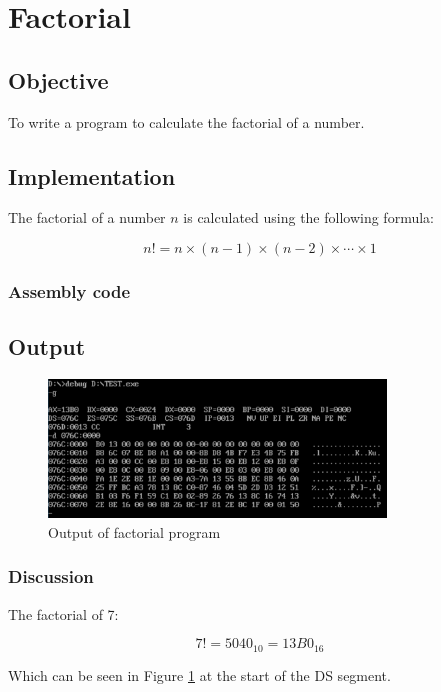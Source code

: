 \section{Factorial}

\subsection{Objective}

To write a program to calculate the factorial of a number.

\subsection{Implementation}

The factorial of a number $n$ is calculated using the following formula:

\begin{equation}
    n! = n \times (n-1) \times (n-2) \times \cdots \times 1
\end{equation}

\subsubsection{Assembly code}


\subsection{Output}

\begin{figure}[ht]
    \centering
    \includegraphics[width=0.8\textwidth]{./res/practicals/fact.png}
    \caption{Output of factorial program}
    \label{fig:fact}
\end{figure}

\subsubsection{Discussion}

The factorial of 7:

\begin{equation}
    7! = 5040_{10} = 13B0_{16}
\end{equation}

Which can be seen in Figure \ref{fig:fact} at the start of the DS segment.